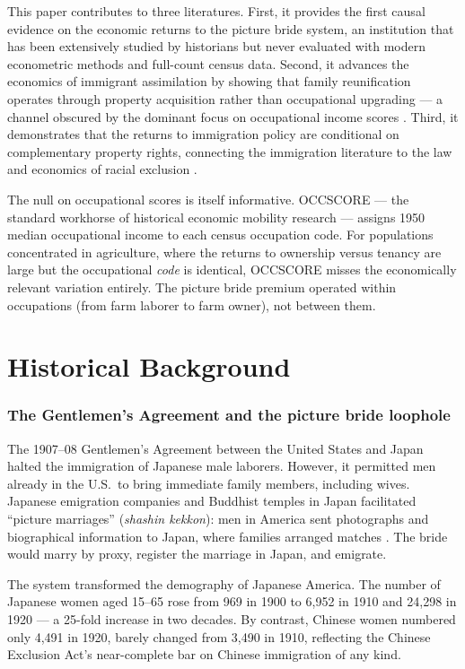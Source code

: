 \documentclass[12pt]{article}
\begin{document}
This paper contributes to three literatures. First, it provides the first causal evidence on the economic returns to the picture bride system, an institution that has been extensively studied by historians \citep{ichioka1980amerika, nakano1990japanese, azuma2005between} but never evaluated with modern econometric methods and full-count census data. Second, it advances the economics of immigrant assimilation by showing that family reunification operates through property acquisition rather than occupational upgrading --- a channel obscured by the dominant focus on occupational income scores \citep{abramitzky2014nation, abramitzky2020immigrants}. Third, it demonstrates that the returns to immigration policy are conditional on complementary property rights, connecting the immigration literature to the law and economics of racial exclusion \citep{almaguer1994racial, ngai2004impossible}.

The null on occupational scores is itself informative. OCCSCORE --- the standard workhorse of historical economic mobility research --- assigns 1950 median occupational income to each census occupation code. For populations concentrated in agriculture, where the returns to ownership versus tenancy are large but the occupational \textit{code} is identical, OCCSCORE misses the economically relevant variation entirely. The picture bride premium operated within occupations (from farm laborer to farm owner), not between them.

\section{Historical Background}

\subsubsection*{The Gentlemen's Agreement and the picture bride loophole}  The 1907--08 Gentlemen's Agreement between the United States and Japan halted the immigration of Japanese male laborers. However, it permitted men already in the U.S.\ to bring immediate family members, including wives. Japanese emigration companies and Buddhist temples in Japan facilitated ``picture marriages'' (\textit{shashin kekkon}): men in America sent photographs and biographical information to Japan, where families arranged matches \citep{ichioka1980amerika}. The bride would marry by proxy, register the marriage in Japan, and emigrate.

The system transformed the demography of Japanese America. The number of Japanese women aged 15--65 rose from 969 in 1900 to 6,952 in 1910 and 24,298 in 1920 --- a 25-fold increase in two decades. By contrast, Chinese women numbered only 4,491 in 1920, barely changed from 3,490 in 1910, reflecting the Chinese Exclusion Act's near-complete bar on Chinese immigration of any kind.
\end{document}
